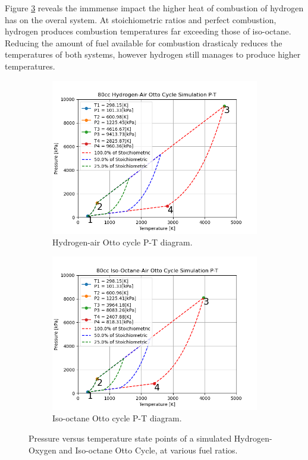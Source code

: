 \documentclass[conf]{new-aiaa}
\begin{document}
Figure \ref{fig:pt_diag} reveals the immmense impact the higher heat of combustion of hydrogen has on the overal system. At stoichiometric ratios and perfect combustion, hydrogen produces combustion temperatures far exceeding those of iso-octane. Reducing the amount of fuel available for combustion drasticaly reduces the temperatures of both systems, however hydrogen still manages to produce higher temperatures.

\begin{figure}[H]
\centering
\begin{subfigure}{0.5\linewidth}
  \centering
  \includegraphics[width=1\linewidth]{Figures/Hydrogen/P-T.png}
  \caption{Hydrogen-air Otto cycle P-T diagram.}
  \label{fig:p-t_diag_h2}
\end{subfigure}%
\begin{subfigure}{0.5\linewidth}
  \centering
  \includegraphics[width=1\linewidth]{Figures/Iso-octane/P-T.png}
  \caption{Iso-octane Otto cycle P-T diagram.}
  \label{fig:p-t_diag_iso}
\end{subfigure}
\caption{Pressure versus temperature state points of a simulated Hydrogen-Oxygen and Iso-octane Otto Cycle, at various fuel ratios.}
\label{fig:pt_diag}
\end{figure}
\end{document}
